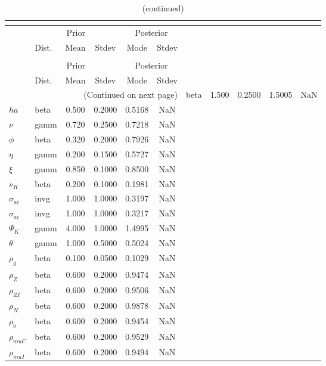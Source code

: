  
\begin{center}
\begin{longtable}{llcccc} 
\caption{Results from posterior maximization (parameters)}\\
 \label{Table:Posterior:1}\\
\toprule 
  & \multicolumn{3}{c}{Prior}  &  \multicolumn{2}{c}{Posterior} \\
  \cmidrule(r{.75em}){2-4} \cmidrule(r{.75em}){5-6}
  & Dist. & Mean  & Stdev & Mode & Stdev \\ 
\midrule \endfirsthead 
\caption{(continued)}\\
 \bottomrule 
  & \multicolumn{3}{c}{Prior}  &  \multicolumn{2}{c}{Posterior} \\
  \cmidrule(r{.75em}){2-4} \cmidrule(r{.75em}){5-6}
  & Dist. & Mean  & Stdev & Mode & Stdev \\ 
\midrule \endhead 
\bottomrule \multicolumn{6}{r}{(Continued on next page)}\endfoot 
\bottomrule\endlastfoot 
${\sigma}$ & beta &   1.500 & 0.2500 &   1.5005 &     NaN \\ 
${ha}$ & beta &   0.500 & 0.2000 &   0.5168 &     NaN \\ 
$\nu$ & gamm &   0.720 & 0.2500 &   0.7218 &     NaN \\ 
${\phi}$ & beta &   0.320 & 0.2000 &   0.7926 &     NaN \\ 
${\eta}$ & gamm &   0.200 & 0.1500 &   0.5727 &     NaN \\ 
$\xi$ & gamm &   0.850 & 0.1000 &   0.8500 &     NaN \\ 
${\nu_R}$ & beta &   0.200 & 0.1000 &   0.1981 &     NaN \\ 
${\sigma_{ac}}$ & invg &   1.000 & 1.0000 &   0.3197 &     NaN \\ 
${\sigma_{ai}}$ & invg &   1.000 & 1.0000 &   0.3217 &     NaN \\ 
${\Psi_{K}}$ & gamm &   4.000 & 1.0000 &   1.4995 &     NaN \\ 
${\theta}$ & gamm &   1.000 & 0.5000 &   0.5024 &     NaN \\ 
${\rho_g}$ & beta &   0.100 & 0.0500 &   0.1029 &     NaN \\ 
${\rho_Z}$ & beta &   0.600 & 0.2000 &   0.9474 &     NaN \\ 
${\rho_{ZI}}$ & beta &   0.600 & 0.2000 &   0.9506 &     NaN \\ 
${\rho_N}$ & beta &   0.600 & 0.2000 &   0.9878 &     NaN \\ 
${\rho_b}$ & beta &   0.600 & 0.2000 &   0.9454 &     NaN \\ 
${\rho_{muC}}$ & beta &   0.600 & 0.2000 &   0.9529 &     NaN \\ 
${\rho_{muI}}$ & beta &   0.600 & 0.2000 &   0.9494 &     NaN \\ 
\end{longtable}
 \end{center}
